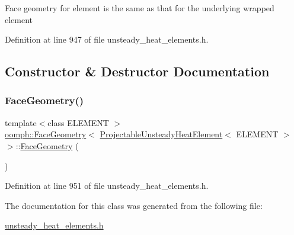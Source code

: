 Face geometry for element is the same as that for the underlying wrapped element 

Definition at line 947 of file unsteady\+\_\+heat\+\_\+elements.\+h.



\subsection{Constructor \& Destructor Documentation}
\mbox{\label{classoomph_1_1FaceGeometry_3_01ProjectableUnsteadyHeatElement_3_01ELEMENT_01_4_01_4_ac3fab47aafbb7bad5d21e95ad6ab119a}} 
\subsubsection{\texorpdfstring{Face\+Geometry()}{FaceGeometry()}}
{\footnotesize\ttfamily template$<$class E\+L\+E\+M\+E\+NT $>$ \\
\hyperlink{classoomph_1_1FaceGeometry}{oomph\+::\+Face\+Geometry}$<$ \hyperlink{classoomph_1_1ProjectableUnsteadyHeatElement}{Projectable\+Unsteady\+Heat\+Element}$<$ E\+L\+E\+M\+E\+NT $>$ $>$\+::\hyperlink{classoomph_1_1FaceGeometry}{Face\+Geometry} (\begin{DoxyParamCaption}{ }\end{DoxyParamCaption})\hspace{0.3cm}{\ttfamily [inline]}}



Definition at line 951 of file unsteady\+\_\+heat\+\_\+elements.\+h.



The documentation for this class was generated from the following file\+:\begin{DoxyCompactItemize}
\item 
\hyperlink{unsteady__heat__elements_8h}{unsteady\+\_\+heat\+\_\+elements.\+h}\end{DoxyCompactItemize}

